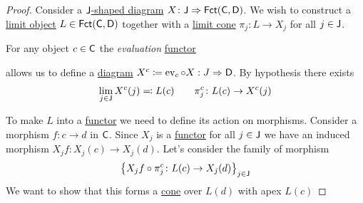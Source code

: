\documentclass[../../main]{subfiles}
\begin{document}
\begin{proof}
  Consider a \hyperref[def:diagram]{\(\mathsf{J}\)-shaped diagram} \(X\colon \mathsf{J} \Rightarrow \mathsf{Fct}(\mathsf{C}, \mathsf{D})\).
  We wish to construct a \hyperref[def:categorical-limit]{limit object} \(L \in \mathsf{Fct}(\mathsf{C}, \mathsf{D})\) together with a \hyperref[def:categorical-limit]{limit cone} \(\pi_{j}\colon L \to X_{j}\) for all \(j \in \mathsf{J}\).

  For any object \(c \in \mathsf{C}\) the \textit{evaluation} \hyperref[def:functor]{functor}
  \begin{center}
  \end{center}
  allows us to define a \hyperref[def:diagram]{diagram} \(X^{c} \coloneq \operatorname{ev}_{c} \circ X: J \Rightarrow \mathsf{D}\).
  By hypothesis there exists
  \begin{equation*}
    \lim_{j \in \mathsf{J}} X^{c}(j) \eqcolon L(c) \qquad \pi_{j}^{c}\colon L(c) \to X^{c}(j)
  \end{equation*}

  To make \(L\) into a \hyperref[def:functor]{functor} we need to define its action on morphisms.
  Consider a morphism \(f\colon c \to d\) in \(\mathsf{C}\).
  Since \(X_{j}\) is a \hyperref[def:functor]{functor} for all \(j \in \mathsf{J}\) we have an induced morphism \(X_{j}f\colon X_{j}(c) \to X_{j}(d)\).
  Let's consider the family of morphism
  \begin{equation*}
    \left\{ X_{j}f \circ \pi_{j}^{c}\colon L(c) \to X_{j}(d) \right\}_{j \in \mathsf{J}}
  \end{equation*}
  We want to show that this forms a \hyperref[def:cone]{cone} over \(L(d)\) with apex \(L(c)\)


\end{proof}
\end{document}
